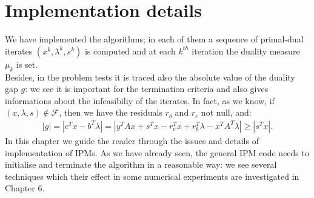 \documentclass[a4paper,10 pt,titlepage,twoside]{report}
\theoremstyle{plain}
\theoremstyle{definition}
\theoremstyle{remark}
\begin{document}
{{%

\chapter{Implementation details}
We have implemented the algorithms; in each of them a sequence of primal-dual iterates $(x^{k},\lambda^{k},s^{k})$ is computed and at each $k^{th}$ iteration the duality measure $\mu_{k}$ is set.\\
Besides, in the problem tests it is traced also the absolute value of the duality gap $g$: we see it is important for the termination criteria and also gives informations about the infeasibiliy of the iterates. In fact, as we know, if $(x,\lambda,s) \notin \mathcal{F}$, then we have the residuals $r_{b}$ and $r_{c}$ not null, and: 
\begin{align*}
|g|=|c^{T}x-b^{T}\lambda|=|y^{T}Ax+s^{T}x-r_{c}^{T}x+r_{b}^{T}\lambda-x^{T}A^{T}\lambda|\geq |s^{T}x|.
\end{align*}
In this chapter we guide the reader through the issues and details of implementation of IPMs. As we have already seen, the general IPM code needs to initialise and terminate the algorithm in a reasonable way: we see several techniques which their effect in some numerical experiments are investigated in Chapter 6.  
}}
\end{document}
